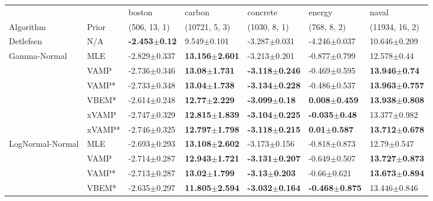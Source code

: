 \begin{tabular}{lllllll}
\toprule
                 &        &                    boston &                     carbon &                   concrete &                     energy &                      naval \\
Algorithm & Prior& (506, 13, 1)& (10721, 5, 3)& (1030, 8, 1)& (768, 8, 2)& (11934, 16, 2)\\
\midrule
Detlefsen & N/A &  \textbf{-2.453$\pm$0.12} &            9.549$\pm$0.101 &           -3.287$\pm$0.031 &           -4.246$\pm$0.037 &           10.646$\pm$0.209 \\
Gamma-Normal & MLE &          -2.829$\pm$0.337 &  \textbf{13.156$\pm$2.601} &           -3.213$\pm$0.201 &           -0.877$\pm$0.799 &            12.578$\pm$0.44 \\
                 & VAMP &          -2.736$\pm$0.346 &   \textbf{13.08$\pm$1.731} &  \textbf{-3.118$\pm$0.246} &           -0.469$\pm$0.595 &   \textbf{13.946$\pm$0.74} \\
                 & VAMP* &          -2.733$\pm$0.348 &   \textbf{13.04$\pm$1.738} &  \textbf{-3.134$\pm$0.228} &           -0.486$\pm$0.537 &  \textbf{13.963$\pm$0.757} \\
                 & VBEM* &          -2.614$\pm$0.248 &   \textbf{12.77$\pm$2.229} &   \textbf{-3.099$\pm$0.18} &   \textbf{0.008$\pm$0.459} &  \textbf{13.938$\pm$0.808} \\
                 & xVAMP &          -2.747$\pm$0.329 &  \textbf{12.815$\pm$1.839} &  \textbf{-3.104$\pm$0.225} &   \textbf{-0.035$\pm$0.48} &           13.377$\pm$0.982 \\
                 & xVAMP* &          -2.746$\pm$0.325 &  \textbf{12.797$\pm$1.798} &  \textbf{-3.118$\pm$0.215} &    \textbf{0.01$\pm$0.587} &  \textbf{13.712$\pm$0.678} \\
LogNormal-Normal & MLE &          -2.693$\pm$0.293 &  \textbf{13.108$\pm$2.602} &           -3.173$\pm$0.156 &           -0.818$\pm$0.873 &            12.79$\pm$0.547 \\
                 & VAMP &          -2.714$\pm$0.287 &  \textbf{12.943$\pm$1.721} &  \textbf{-3.131$\pm$0.207} &           -0.649$\pm$0.507 &  \textbf{13.727$\pm$0.873} \\
                 & VAMP* &          -2.713$\pm$0.287 &   \textbf{13.02$\pm$1.799} &   \textbf{-3.13$\pm$0.203} &            -0.66$\pm$0.621 &  \textbf{13.673$\pm$0.894} \\
                 & VBEM* &          -2.635$\pm$0.297 &  \textbf{11.805$\pm$2.594} &  \textbf{-3.032$\pm$0.164} &  \textbf{-0.468$\pm$0.875} &           13.446$\pm$0.846 \\

\end{tabular}
